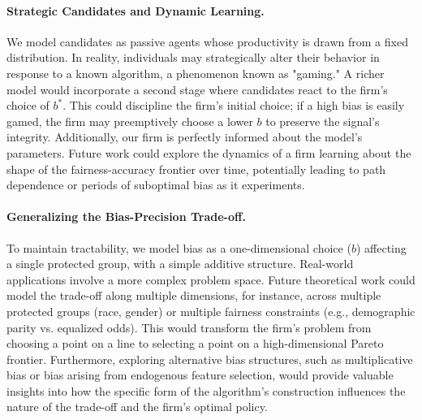 \paragraph{Strategic Candidates and Dynamic Learning.}
We model candidates as passive agents whose productivity is drawn from a fixed distribution. In reality, individuals may strategically alter their behavior in response to a known algorithm, a phenomenon known as "gaming." A richer model would incorporate a second stage where candidates react to the firm's choice of $b^*$. This could discipline the firm's initial choice; if a high bias is easily gamed, the firm may preemptively choose a lower $b$ to preserve the signal's integrity. Additionally, our firm is perfectly informed about the model's parameters. Future work could explore the dynamics of a firm learning about the shape of the fairness-accuracy frontier over time, potentially leading to path dependence or periods of suboptimal bias as it experiments.

\paragraph{Generalizing the Bias-Precision Trade-off.}
To maintain tractability, we model bias as a one-dimensional choice ($b$) affecting a single protected group, with a simple additive structure. Real-world applications involve a more complex problem space. Future theoretical work could model the trade-off along multiple dimensions, for instance, across multiple protected groups (race, gender) or multiple fairness constraints (e.g., demographic parity vs. equalized odds). This would transform the firm's problem from choosing a point on a line to selecting a point on a high-dimensional Pareto frontier. Furthermore, exploring alternative bias structures, such as multiplicative bias or bias arising from endogenous feature selection, would provide valuable insights into how the specific form of the algorithm's construction influences the nature of the trade-off and the firm's optimal policy.